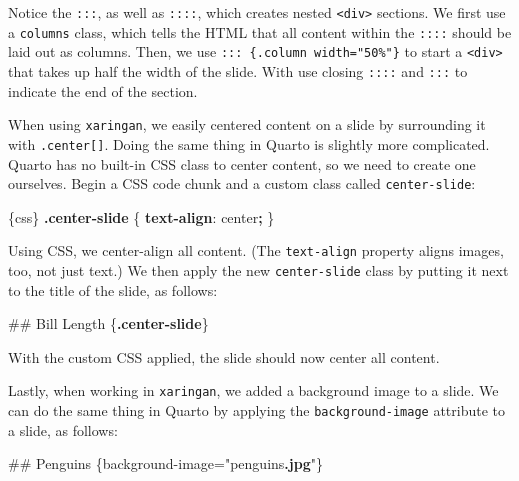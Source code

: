 \documentclass[
]{book}
\newenvironment{Shaded}{\begin{snugshade}}{\end{snugshade}}
\newcommand{\DecValTok}[1]{\textcolor[rgb]{0.00,0.00,0.81}{#1}}
\newcommand{\FunctionTok}[1]{\textcolor[rgb]{0.13,0.29,0.53}{\textbf{#1}}}
\newcommand{\KeywordTok}[1]{\textcolor[rgb]{0.13,0.29,0.53}{\textbf{#1}}}
\newcommand{\NormalTok}[1]{#1}
\newcommand{\OperatorTok}[1]{\textcolor[rgb]{0.81,0.36,0.00}{\textbf{#1}}}
\begin{document}
Notice the \texttt{:::}, as well as \texttt{::::}, which creates nested \texttt{\textless{}div\textgreater{}} sections. We first use a \texttt{columns} class, which tells the HTML that all content within the \texttt{::::} should be laid out as columns. Then, we use \texttt{:::\ \{.column\ width="50\%"\}} to start a \texttt{\textless{}div\textgreater{}} that takes up half the width of the slide. With use closing \texttt{::::} and \texttt{:::} to indicate the end of the section.

When using \texttt{xaringan}, we easily centered content on a slide by surrounding it with \texttt{.center{[}{]}}. Doing the same thing in Quarto is slightly more complicated. Quarto has no built-in CSS class to center content, so we need to create one ourselves. Begin a CSS code chunk and a custom class called \texttt{center-slide}:

\begin{Shaded}
\begin{Highlighting}[]
\NormalTok{\textasciigrave{}\textasciigrave{}\textasciigrave{}\{css\}}
\FunctionTok{.center{-}slide}\NormalTok{ \{}
    \KeywordTok{text{-}align}\NormalTok{: }\DecValTok{center}\OperatorTok{;}
\NormalTok{\}}
\NormalTok{\textasciigrave{}\textasciigrave{}\textasciigrave{}}
\end{Highlighting}
\end{Shaded}

Using CSS, we center-align all content. (The \texttt{text-align} property aligns images, too, not just text.) We then apply the new \texttt{center-slide} class by putting it next to the title of the slide, as follows:

\begin{Shaded}
\begin{Highlighting}[]
\NormalTok{\#\# Bill Length \{}\FunctionTok{.center{-}slide}\NormalTok{\}}
\end{Highlighting}
\end{Shaded}

With the custom CSS applied, the slide should now center all content.

Lastly, when working in \texttt{xaringan}, we added a background image to a slide. We can do the same thing in Quarto by applying the \texttt{background-image} attribute to a slide, as follows:

\begin{Shaded}
\begin{Highlighting}[]
\NormalTok{\#\# Penguins \{background{-}image="penguins}\FunctionTok{.jpg}\NormalTok{"\}}
\end{Highlighting}
\end{Shaded}
\end{document}
